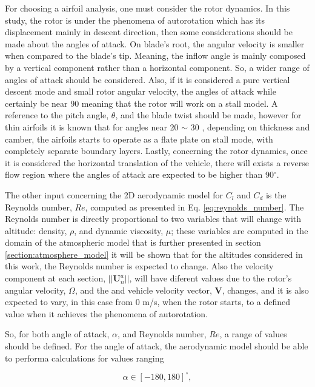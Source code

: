 For choosing a airfoil analysis, one must consider the rotor dynamics. In this study, the rotor is under the phenomena of autorotation which has its displacement mainly in descent direction, then some considerations should be made about the angles of attack. On blade's root, the angular velocity is smaller when compared to the blade's tip. Meaning, the inflow angle is mainly composed by a vertical component rather than a horizontal component. So, a wider range of angles of attack should be considered. Also, if it is considered a pure vertical descent mode and small rotor angular velocity, the angles of attack while certainly be near 90 \unit{\deg} meaning that the rotor will work on a stall model. A reference to the pitch angle, $\theta$, and the blade twist should be made, however for thin airfoils it is known that for angles near 20 $\sim$ 30 \unit{\deg}, depending on thickness and camber, the airfoils starts to operate as a flate plate on stall mode, with completely separate boundary layers. Lastly, concerning the rotor dynamics, once it is considered the horizontal translation of the vehicle, there will exists a reverse flow region where the angles of attack are expected to be higher than 90$^{\circ}$.

The other input concerning the 2D aerodynamic model for $C_l$ and $C_d$ is the Reynolds number, $Re$, computed as presented in Eq. \ref{eq:reynolds_number}. The Reynolds number is directly proportional to two variables that will change with altitude: density, $\rho$, and dynamic viscosity, $\mu$; these variables are computed in the domain of the atmospheric model that is further presented in section \ref{section:atmosphere_model} it will be shown that for the altitudes considered in this work, the Reynolds number is expected to change. Also the velocity component at each section, $||\mathbf{U}^a_n||$, will have diferent values due to the rotor's angular velocity, $\Omega$, and the and vehicle velocity vector, $\mathbf{V}$, changes, and it is also expected to vary, in this case from 0 \unit{m/s}, when the rotor starts, to a defined value when it achieves the phenomena of autorotation.

So, for both angle of attack, $\alpha$, and Reynolds number, $Re$, a range of values should be defined. For the angle of attack, the aerodynamic model should be able to performa calculations for values ranging 

\begin{equation}
    \alpha \in [-180, 180] ^{\circ},
\end{equation}

